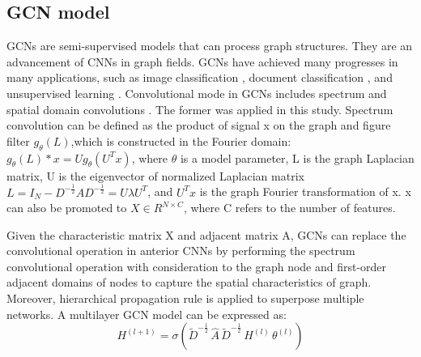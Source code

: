 \documentclass[10pt,journal,compsoc]{IEEEtran}
\begin{document}
\subsection{GCN model}
\par GCNs are semi-supervised models that can process graph structures. They are an advancement of CNNs in graph fields. GCNs have achieved many progresses in many applications, such as image classification \cite{Bruna2013Spectral}, document classification \cite{defferrard2016convolutional}, and unsupervised learning \cite{kipf2016semisupervised}. Convolutional mode in GCNs includes spectrum and spatial domain convolutions \cite{Bruna2013Spectral}. The former was applied in this study. Spectrum convolution can be defined as the product of signal x on the graph and figure filter $g_\theta(L)$,which is constructed in the Fourier domain:$g_\theta(L) \ast x = Ug_\theta(U^Tx)$, where $\theta$ is a model parameter, L is the graph Laplacian matrix, U is the eigenvector of normalized Laplacian matrix $L = I_N - D^{-\frac{1}{2}}AD^{-\frac{1}{2}} = U\lambda U^T$, and $U^Tx$ is the graph Fourier transformation of x. x can also be promoted to $X\in R^{N\times C}$, where C refers to the number of features.
\par Given the characteristic matrix X and adjacent matrix A, GCNs can replace the convolutional operation in anterior CNNs by performing the spectrum convolutional operation with consideration to the graph node and first-order adjacent domains of nodes to capture the spatial characteristics of graph. Moreover, hierarchical propagation rule is applied to superpose multiple networks. A multilayer GCN model can be expressed as:
\begin{equation}
    H^{\left(l+1\right)}=\sigma\left(\widetilde{D}^{-\frac{1}{2}}\,\widehat{A}\,\widetilde{D}^{-\frac{1}{2}}\,H^{\left(l\right)}\,\theta^{\left(l\right)}\right)
\end{equation}
\end{document}
